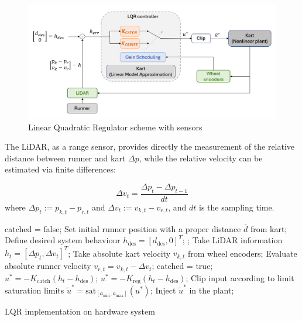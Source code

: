 \documentclass[a4paper,12pt,oneside]{book}
\begin{document}
\begin{figure}
	\centering
	\includegraphics[width=1.0\textwidth]{LQR_hard_scheme.png}
	\caption{Linear Quadratic Regulator scheme with sensors}
	\label{image:LQR_hard_scheme}
\end{figure}

The LiDAR, as a range sensor, provides directly the measurement of the relative distance between runner and kart $\Delta p$, while the relative velocity can be estimated via finite differences:

\begin{equation}
	\Delta v_t = \frac{\Delta p_t - \Delta p_{t-1}} {dt}
\end{equation}
where $\Delta p_t := p_{k,t} - p_{r,t}$ and $\Delta v_t := v_{k,t} - v_ {r,t}$, and $dt$ is the sampling time.

\begin{algorithm}
\begin{algorithmic}[1]
	\State catched = false;
	\State Set initial runner position with a proper distance $\bar{d}$ from kart;
	\State Define desired system behaviour  $h_{\text{des}} = [d_{\text{des}}, 0]^T$;
	;
		\State Take LiDAR information $h_t = [\Delta p_t, \Delta v_t]^T$;
		\State Take absolute kart velocity $v_{k,t}$ from wheel encoders;
		\State Evaluate absolute runner velocity $v_{r,t} = v_{k,t} - \Delta v_t $;
			\State catched = true;
		\EndIf
			\State $u^* = - K_{\text{catch}} (h_t - h_{\text{des}}) $;
		\Else 
			\State $u^* = - K_{\text{reg}} (h_t - h_{\text{des}}) $;
		\EndIf
		\State Clip input according to limit saturation limits $\tilde{u}^* = \text{sat}_{[a_{\min}, a_{\max}]} (u^*)$;
		\State Inject $\tilde{u}^*$ in the plant;
	\EndFor
\caption{LQR implementation on hardware system}
\label{alg:LQR_hard_implementation}
\end{algorithmic}
\end{algorithm}
\end{document}
